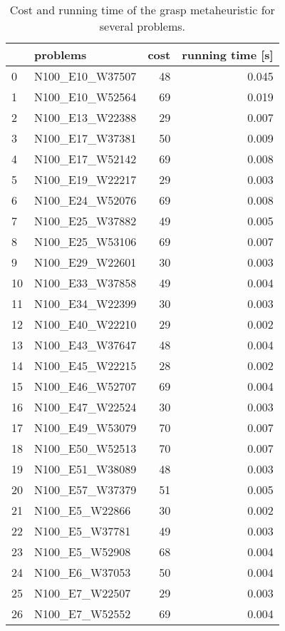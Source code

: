 \begin{table}[H]
\centering
\begin{tabular}{llrr}
\toprule
{} &            problems &  cost &  running time [s] \\
\midrule
0  &     N100\_E10\_W37507 &    48 &             0.045 \\
1  &     N100\_E10\_W52564 &    69 &             0.019 \\
2  &     N100\_E13\_W22388 &    29 &             0.007 \\
3  &     N100\_E17\_W37381 &    50 &             0.009 \\
4  &     N100\_E17\_W52142 &    69 &             0.008 \\
5  &     N100\_E19\_W22217 &    29 &             0.003 \\
6  &     N100\_E24\_W52076 &    69 &             0.008 \\
7  &     N100\_E25\_W37882 &    49 &             0.005 \\
8  &     N100\_E25\_W53106 &    69 &             0.007 \\
9  &     N100\_E29\_W22601 &    30 &             0.003 \\
10 &     N100\_E33\_W37858 &    49 &             0.004 \\
11 &     N100\_E34\_W22399 &    30 &             0.003 \\
12 &     N100\_E40\_W22210 &    29 &             0.002 \\
13 &     N100\_E43\_W37647 &    48 &             0.004 \\
14 &     N100\_E45\_W22215 &    28 &             0.002 \\
15 &     N100\_E46\_W52707 &    69 &             0.004 \\
16 &     N100\_E47\_W22524 &    30 &             0.003 \\
17 &     N100\_E49\_W53079 &    70 &             0.007 \\
18 &     N100\_E50\_W52513 &    70 &             0.007 \\
19 &     N100\_E51\_W38089 &    48 &             0.003 \\
20 &     N100\_E57\_W37379 &    51 &             0.005 \\
21 &      N100\_E5\_W22866 &    30 &             0.002 \\
22 &      N100\_E5\_W37781 &    49 &             0.003 \\
23 &      N100\_E5\_W52908 &    68 &             0.004 \\
24 &      N100\_E6\_W37053 &    50 &             0.004 \\
25 &      N100\_E7\_W22507 &    29 &             0.003 \\
26 &      N100\_E7\_W52552 &    69 &             0.004 \\
\bottomrule
\end{tabular}
\caption{Cost and running time of the grasp metaheuristic for several problems.}
\label{table:greedy-medium-results-I}
\end{table}

